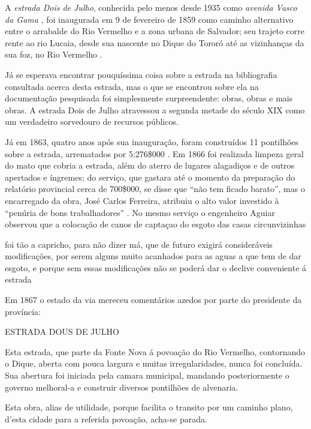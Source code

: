 A \textit{estrada Dois de Julho}, conhecida pelo menos desde 1935 como \textit{avenida Vasco da Gama} \cite[p.~142]{souza_guia_1935}, foi inaugurada em 9 de fevereiro de 1859 \cite[p.~20]{silvalima_dique_1899} como caminho alternativo entre o arrabalde do Rio Vermelho e a zona urbana de Salvador; seu trajeto corre rente ao rio Lucaia, desde sua nascente no Dique do Tororó até as vizinhanças da sua foz, no Rio Vermelho \cite[p.~582]{ruy_politica_1949}.

Já se esperava encontrar pouquíssima coisa sobre a estrada na bibliografia consultada acerca desta estrada, mas o que se encontrou sobre ela na documentação pesquisada foi simplesmente surpreendente: obras, obras e mais obras. A estrada Dois de Julho atravessou a segunda metade do século XIX como um verdadeiro sorvedouro de recursos públicos.

Já em 1863, quatro anos após sua inauguração, foram construídos 11 pontilhões sobre a estrada, arrematados por 5:276\$000 \cite[p.~66]{bahia_rpe_1863b}. Em 1866 foi realizada limpeza geral do mato que cobria a estrada, além do aterro de lugares alagadiços e de outros apertados e íngremes; do serviço, que gastara até o momento da preparação do relatório provincial cerca de 700\$000, se disse que ``não tem ficado barato'', mas o encarregado da obra, José Carlos Ferreira, atribuiu o alto valor investido à ``penúria de bons trabalhadores'' \cite[p.~76]{bahia_rpe_1866}. No mesmo serviço o engenheiro Aguiar observou que a colocação de canos de captaçao do esgoto das casas circunvizinhas 

\begin{citacao}
foi tão a capricho, para não dizer má, que de futuro exigirá consideráveis modificações, por serem alguns muito acanhados para as aguas a que tem de dar esgoto, e porque sem essas modificações não se poderá dar o declive conveniente á estrada \cite[p.~76]{bahia_rpe_1866}
\end{citacao}

Em 1867 o estado da via mereceu comentários azedos por parte do presidente da província:

\begin{citacao}
ESTRADA DOUS DE JULHO

Esta estrada, que parte da Fonte Nova á povoação do Rio Vermelho, contornando o Dique, aberta com pouca largura e muitas irregularidades, nunca foi concluída. Sua abertura foi iniciada pela camara municipal, mandando posteriormente o governo melhoral-a e construir diversos pontilhões de alvenaria. 

Esta obra, alias de utilidade, porque facilita o transito por um caminho plano, d'esta cidade para a referida povoação, acha-se parada. \cite[obras publicas,~p.~9]{bahia_rpe_1867}
\end{citacao}

